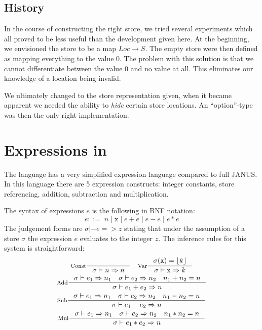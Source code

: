 \subsection{History}

In the course of constructing the right store, we tried several
experiments which all proved to be less useful than the development
given here. At the beginning, we envisioned the store to be a map $Loc
\to S$. The empty store were then defined as mapping everything to the
value $0$. The problem with this solution is that we cannot
differentiate between the value $0$ and no value at all. This
eliminates our knowledge of a location being invalid.

We ultimately changed to the store representation given, when it
became apparent we needed the ability to \emph{hide} certain store
locations. An ``option''-type was then the only right implementation.

\section{Expressions in \janusz{}}

The \janusz{} language has a very simplified expression language
compared to full JANUS. In this language there are 5 expression
constructs: integer constants, store referencing, addition,
subtraction and multiplication.

The syntax of expressions $e$ is the following in BNF notation:
\newcommand{\bor}{\; | \;}
\begin{equation*}
  e ::= \; n \bor \mathtt{x} \bor e + e \bor e - e \bor e * e
\end{equation*}
The judgement forms are $\sigma |- e => z$ stating that under the
assumption of a store $\sigma$ the expression $e$ evaluates to the
integer $z$. The inference rules for this system is straightforward:
\begin{gather*}
  \inference[Const]{}{\sigma |- n => n} \quad \inference[Var]{\sigma(\mathtt{x}) =
    \lift{k}}{\sigma |- \mathtt{x} => k} \\
  \inference[Add]{\sigma |- e_1 => n_1 \quad \sigma |- e_2 => n_2 \quad
    n_1 + n_2 = n}{\sigma |- e_1 + e_2 => n} \\
  \inference[Sub]{\sigma |- e_1 => n_1 \quad \sigma |- e_2 => n_2 \quad
    n_1 - n_2 = n}{\sigma |- e_1 - e_2 => n} \\
  \inference[Mul]{\sigma |- e_1 => n_1 \quad \sigma |- e_2 => n_2 \quad
    n_1 * n_2 = n}{\sigma |- e_1 * e_2 => n}
\end{gather*}

